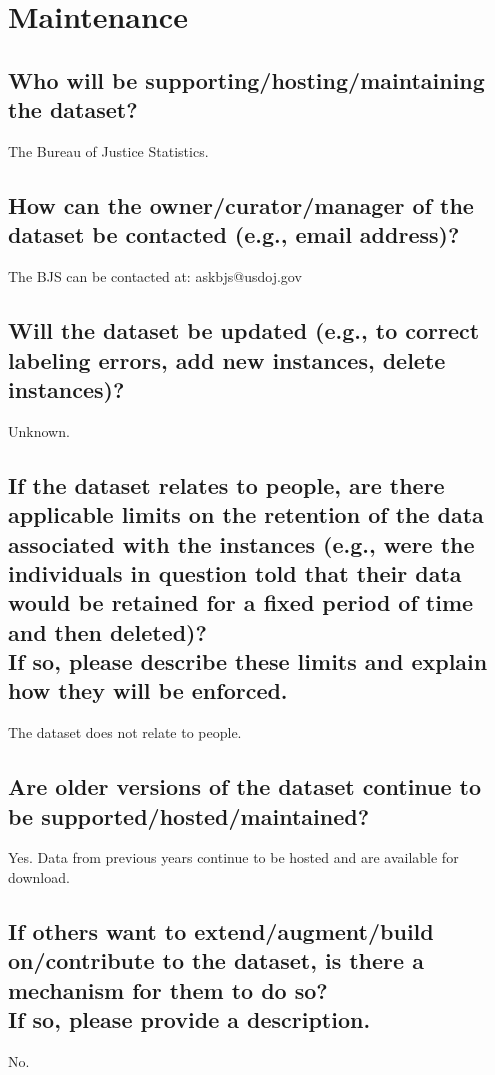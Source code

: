 \documentclass[letterpaper, 10 pt, conference]{ieeeconf}  %
\newcommand{\subtitle}[1]{{\\ \small \normalfont \color{purple} #1}}
\begin{document}
\section{Maintenance}

\subsection{Who will be supporting/hosting/maintaining the dataset?}

The Bureau of Justice Statistics.

\subsection{How can the owner/curator/manager of the dataset be contacted (e.g., email address)?}

The BJS can be contacted at: askbjs@usdoj.gov

\subsection{Will the dataset be updated (e.g., to correct labeling errors, add new instances, delete instances)?}

Unknown.

\subsection{If the dataset relates to people, are there applicable limits on the retention of the data associated with the instances (e.g., were the individuals in question told that their data would be retained for a fixed period of time and then deleted)? \subtitle{If so, please describe these limits and explain how they will be enforced.}}

The dataset does not relate to people.

\subsection{Are older versions of the dataset continue to be supported/hosted/maintained?}


Yes. Data from previous years continue to be hosted and are available for download.

\subsection{If others want to extend/augment/build on/contribute to the dataset, is there a mechanism for them to do so? \subtitle{If so, please provide a description.}}

No.

\medskip
 
  

\end{document}
